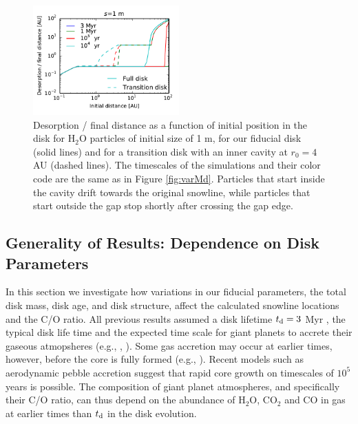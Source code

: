 \documentclass[apj]{emulateapj}
\begin{document}
\begin{figure}[h!]
\centering
\includegraphics[width=0.5\textwidth]{desorption_distance_transition_disk_1000.pdf}
\caption{Desorption / final distance as a function of initial position in the disk for H$_2$O particles of initial size of 1 m, for our fiducial disk (solid lines) and for a transition disk with an inner cavity at $r_0=4$ AU (dashed lines). The timescales of the simulations and their color code are the same as in Figure \ref{fig:varMd}. Particles that start inside the cavity drift towards the original snowline, while particles that start outside the gap stop shortly after crossing the gap edge.}
\label{fig:cavity}
\end{figure}


\subsection{Generality of Results: Dependence on Disk Parameters}
\label{sec:incond}

In this section we investigate how variations in our fiducial parameters, the total disk mass, disk age, and disk structure, %
affect the calculated snowline locations and the C/O ratio. %
All previous results assumed a disk lifetime $t_{\rm d}=3$ Myr%
, the typical disk life time and the expected time scale for giant planets to accrete their gaseous atmopsheres (e.g., \citealt{pollack96}, \citealt{piso14}). Some gas accretion may occur at earlier times, however,%
before the core is fully formed (e.g., \citealt{rafikov06}). Recent models such as aerodynamic pebble accretion \citep{lambrechts12} suggest that rapid core growth on timescales of $10^5$ years is possible. %
The composition of giant planet atmospheres, and specifically their C/O ratio, can thus depend on the abundance of H$_2$O, CO$_2$ and CO in gas at earlier times than $t_{\rm d}$ in the disk evolution. 
\end{document}
